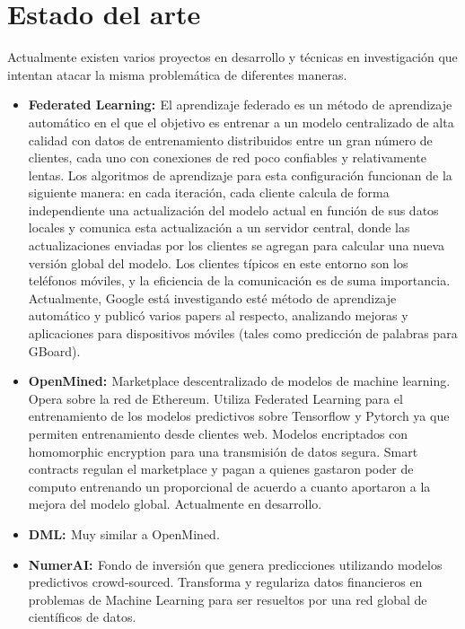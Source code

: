 \documentclass[
11pt, %
oneside, %
spanish, %
singlespacing, %
parskip, %
headsepline, %
chapterinoneline, %
]{MastersDoctoralThesis} %
\begin{document}
\chapter{Estado del arte}

Actualmente existen varios proyectos en desarrollo y técnicas en investigación que intentan atacar la misma problemática de diferentes maneras.

\begin{itemize}
\item \textbf{Federated Learning: \cite{fedlearn2}} El aprendizaje federado es un método de aprendizaje automático en el que el objetivo es entrenar a un modelo centralizado de alta calidad con datos de entrenamiento distribuidos entre un gran número de clientes, cada uno con conexiones de red poco confiables y relativamente lentas. Los algoritmos de aprendizaje para esta configuración funcionan de la siguiente manera: en cada iteración, cada cliente calcula de forma independiente una actualización del modelo actual en función de sus datos locales y comunica esta actualización a un servidor central, donde las actualizaciones enviadas por los clientes se agregan para calcular una nueva versión global del modelo. Los clientes típicos en este entorno son los teléfonos móviles, y la eficiencia de la comunicación es de suma importancia. Actualmente, Google está investigando \cite{fedlearn1} \cite{fedlearn3} \cite{fedlearn4} \cite{fedlearn5} \cite{fedlearn6} esté método de aprendizaje automático y publicó varios papers al respecto, analizando mejoras y aplicaciones para dispositivos móviles (tales como predicción de palabras para GBoard).

\item \textbf{OpenMined: \cite{om}} Marketplace descentralizado de modelos de machine learning. Opera sobre la red de Ethereum. Utiliza Federated Learning para el entrenamiento de los modelos predictivos sobre Tensorflow y Pytorch ya que permiten entrenamiento desde clientes web. Modelos encriptados con homomorphic encryption \cite{homenc} para una transmisión de datos segura. 
Smart contracts regulan el marketplace y pagan a quienes gastaron poder de computo entrenando un proporcional de acuerdo a cuanto aportaron a la mejora del modelo global.
Actualmente en desarrollo.

\item \textbf{DML: \cite{dml}} Muy similar a OpenMined.

\item \textbf{NumerAI: \cite{nai}} Fondo de inversión que genera predicciones utilizando modelos predictivos crowd-sourced. Transforma y regulariza datos financieros en problemas de Machine Learning para ser resueltos por una red global de científicos de datos.


\end{itemize}
\end{document}
